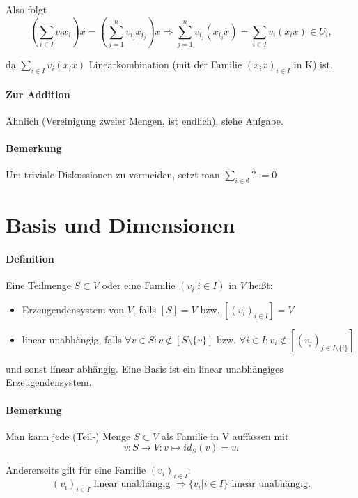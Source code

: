 	Also folgt
	\begin{equation*}
		(\sum_{i\in I}v_i x_i) x = (\sum_{j=1}^{n} v_{i_j}x_{i_j})x \Rightarrow \sum_{j=1}^{n} v_{i_j}(x_{i_j}x) = \sum_{i\in I} v_i(x_ix) \in U_i,
	\end{equation*}

	da $\sum_{i\in I} v_i(x_ix)$ Linearkombination (mit der Familie $(x_ix)_{i\in I}$ in K) ist.

\paragraph{Zur Addition}
	Ähnlich (Vereinigung zweier Mengen, ist endlich), siehe Aufgabe.
\paragraph{Bemerkung}
	Um triviale Diskussionen zu vermeiden, setzt man $\sum_{i\in \emptyset} ?:=0$

\section{Basis und Dimensionen}

\paragraph{Definition}
	Eine Teilmenge $S\subset V$ oder eine Familie $(v_i| i\in I)$ in $ V $ heißt:
	\begin{itemize}
		\item Erzeugendensystem von $ V $, falls $[S] = V$ bzw. $[(v_i)_{i\in I}] = V$
		\item linear unabhängig, falls $\forall v\in S: v \notin [S\setminus\{{v\}}]$ bzw. $\forall i\in I: v_i \notin [(v_j)_{j\in I\setminus\{{i\}}}]$
	\end{itemize}

	und sonst linear abhängig. Eine Basis ist ein linear unabhängiges Erzeugendensystem.

\paragraph{Bemerkung}
	Man kann jede (Teil-) Menge $S\subset V$ als Familie in V auffassen mit
	\begin{equation*}
		v: S \to V: v\mapsto id_S(v) = v.
	\end{equation*}
	
	Andererseits gilt für eine Familie $(v_i)_{i\in I} $:
	\begin{equation*}
		(v_i)_{i\in I} \text{ linear unabhängig } \Rightarrow \{v_i| i\in I\} \text{ linear unabhängig.}
	\end{equation*}
	
